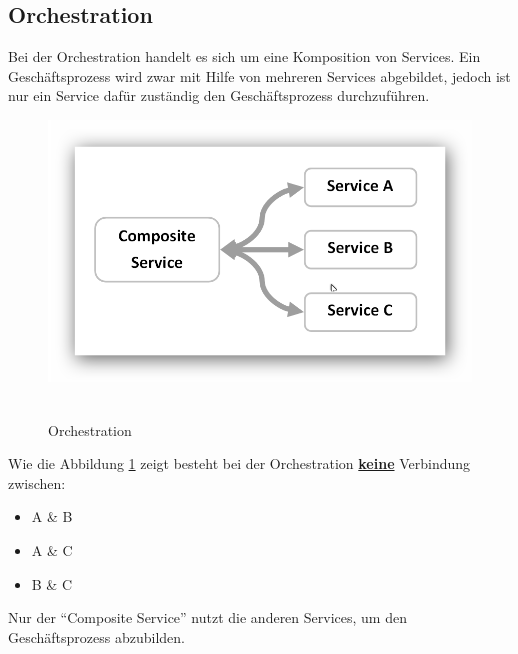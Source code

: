 \subsection*{Orchestration}
\label{subsec:orchestration}
Bei der Orchestration handelt es sich um eine Komposition von Services. Ein Geschäftsprozess wird zwar mit Hilfe von mehreren Services abgebildet, jedoch ist nur ein Service dafür zuständig den Geschäftsprozess durchzuführen.
\newpage
\begin{figure}[htb]
    \centering 
    \includegraphics[width=\linewidth]{content/images/ServiceOrchestration}\
    \caption[Orchestration]{Orchestration}
    \label{fig:ServiceOrchestration}  
\end{figure}

Wie die Abbildung \ref{fig:ServiceOrchestration} zeigt besteht bei der Orchestration \textbf{\underline{keine}} Verbindung zwischen:
\begin{itemize}
    \item A \& B
    \item A \& C
    \item B \& C
\end{itemize}
Nur der "`Composite Service"' nutzt die anderen Services, um den Geschäftsprozess abzubilden.

